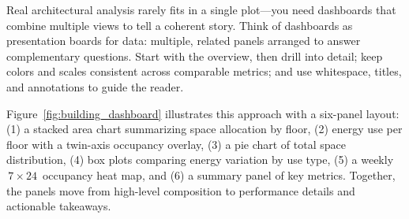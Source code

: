 
Real architectural analysis rarely fits in a single plot—you need dashboards that combine multiple views to tell a coherent story. Think of dashboards as presentation boards for data: multiple, related panels arranged to answer complementary questions. Start with the overview, then drill into detail; keep colors and scales consistent across comparable metrics; and use whitespace, titles, and annotations to guide the reader.

Figure~\ref{fig:building_dashboard} illustrates this approach with a six-panel layout: (1) a stacked area chart summarizing space allocation by floor, (2) energy use per floor with a twin-axis occupancy overlay, (3) a pie chart of total space distribution, (4) box plots comparing energy variation by use type, (5) a weekly \(\,7\times24\,\) occupancy heat map, and (6) a summary panel of key metrics. Together, the panels move from high-level composition to performance details and actionable takeaways.


